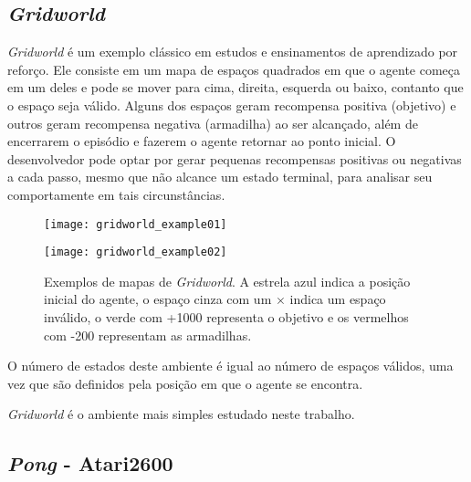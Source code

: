 \subsection{\textit{Gridworld}}
\label{sec:gridworld}

\textit{Gridworld} é um exemplo clássico em estudos e ensinamentos de aprendizado por reforço.
Ele consiste em um mapa de espaços quadrados em que o agente começa em um deles e pode se mover para cima, direita, esquerda ou baixo, contanto que o espaço seja válido.
Alguns dos espaços geram recompensa positiva (objetivo) e outros geram recompensa negativa (armadilha) ao ser alcançado, além de encerrarem o episódio e fazerem o agente retornar ao ponto inicial.
O desenvolvedor pode optar por gerar pequenas recompensas positivas ou negativas a cada passo, mesmo que não alcance um estado terminal, para analisar seu comportamente em tais circunstâncias.

\begin{figure}[h!]
  \begin{minipage}[b]{.6\textwidth}
  \centering
  \texttt{[image: gridworld\_example01]}
  \end{minipage}
  \hfill
  \begin{minipage}[b]{.35\textwidth}
  \texttt{[image: gridworld\_example02]}
  \end{minipage}
  \centering
  \caption{Exemplos de mapas de \textit{Gridworld}. A estrela azul indica a posição inicial do agente, o espaço cinza com um $\times$ indica um espaço inválido, o verde com +1000 representa o objetivo e os vermelhos com -200 representam as armadilhas.}
\end{figure}

O número de estados deste ambiente é igual ao número de espaços válidos, uma vez que são definidos pela posição em que o agente se encontra.

\textit{Gridworld} é o ambiente mais simples estudado neste trabalho.

\subsection{\textit{Pong} - Atari2600}
\label{sec:pong}

